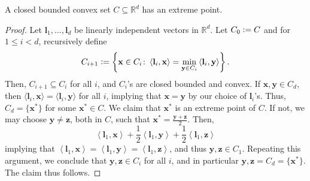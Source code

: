 \begin{thm}
    A closed bounded convex set $C \subseteq \mathbb{R}^d$ has an extreme point. 
\end{thm}
\begin{proof}
    Let $\mathbf{l}_1, \ldots, \mathbf{l}_d$ be linearly independent vectors in $\mathbb{R}^d$. Let $C_0 \vcentcolon= C$ and for $1 \leq i < d$, recursively define
    \[
        C_{i+1} \vcentcolon= \left\{ \mathbf{x} \in C_i \colon \left\langle \mathbf{l}_i, \mathbf{x} \right\rangle = \min_{\mathbf{y} \in C_i} \left\langle \mathbf{l}_i, \mathbf{y} \right\rangle \right\}.
    \]
    Then, $C_{i+1} \subseteq C_i$ for all $i$, and $C_i$'s are closed bounded and convex. If $\mathbf{x}, \mathbf{y} \in C_d$, then $\langle \mathbf{l}_i, \mathbf{x}\rangle = \langle \mathbf{l}_i, \mathbf{y} \rangle$ for all $i$, implying that $\mathbf{x} = \mathbf{y}$ by our choice of $\mathbf{l}_i$'s. Thus, $C_d = \{ \mathbf{x}^* \}$ for some $\mathbf{x}^* \in C$. We claim that $\mathbf{x}^*$ is an extreme point of $C$. If not, we may choose $\mathbf{y} \neq \mathbf{z}$, both in $C$, such that $\mathbf{x}^* = \frac{\mathbf{y} + \mathbf{z}}{2}$. Then,
    \[
        \left\langle \mathbf{l}_1, \mathbf{x} \right\rangle + \frac{1}{2}\left\langle \mathbf{l}_1, \mathbf{y} \right\rangle + \frac{1}{2}\left\langle \mathbf{l}_1, \mathbf{z} \right\rangle
    \]
    implying that $\left\langle \mathbf{l}_1, \mathbf{x} \right\rangle = \left\langle \mathbf{l}_1, \mathbf{y} \right\rangle = \left\langle \mathbf{l}_1, \mathbf{z} \right\rangle$, and thus $\mathbf{y}, \mathbf{z} \in C_1$. Repeating this argument, we conclude that $\mathbf{y}, \mathbf{z} \in C_i$ for all $i$, and in particular $\mathbf{y}, \mathbf{z} = C_d = \{ \mathbf{x}^* \}$. The claim thus follows. 
\end{proof}

